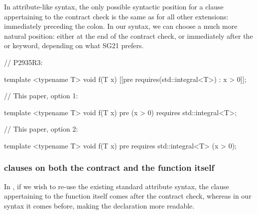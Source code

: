 In attribute-like syntax, the only possible syntactic position for a   clause appertaining to the contract check is the same as for all other extensions: immediately preceding the colon. In our syntax, we can choose a much more natural position: either at the end of the contract check, or immediately after the  or  keyword, depending on what SG21 prefers.


\begin{minipage}[t]{8.7cm}
\begin{codeblock}
// P2935R3:

template <typename T>
void f(T x)
  [[pre requires(std::integral<T>) : x > 0]];
\end{codeblock}
\end{minipage}
\begin{minipage}[t]{8cm}
\begin{codeblock}
// This paper, option 1:

template <typename T>
void f(T x)
  pre (x > 0) requires std::integral<T>;
\end{codeblock}
\end{minipage}

\begin{minipage}[t]{8.7cm}
\phantom{x}
\end{minipage}
\begin{minipage}[t]{8cm}
\begin{codeblock}
// This paper, option 2:

template <typename T>
void f(T x)
  pre requires std::integral<T> (x > 0);
\end{codeblock}
\end{minipage}


\subsubsection{ clauses on both the contract and the function itself}

In \cite{P2935R3}, if we wish to re-use the existing standard attribute syntax, the  clause appertaining to the function itself comes after the contract check, whereas in our syntax it comes before, making the declaration more readable.

